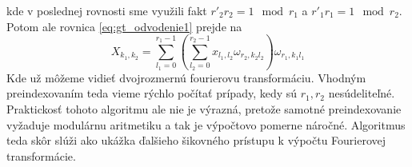 kde v poslednej rovnosti sme využili fakt $r'_2 r_2 = 1 \mod r_1$
a $r'_1 r_1 = 1 \mod r_2$.
Potom ale rovnica \ref{eq:gt_odvodenie1} prejde na
\begin{equation}
    X_{k_1,k_2} 
            = \sum_{l_1=0}^{r_1-1} 
              \left(
                \sum_{l_2=0}^{r_2-1}
                x_{l_1, l_2} \omega_{r_2, k_2 l_2}  
                \right)
              \omega_{r_1, k_1 l_1} 
\end{equation}
Kde už môžeme vidieť dvojrozmernú fourierovu transformáciu. Vhodným
preindexovaním teda vieme rýchlo počítať prípady, kedy sú $r_1,r_2$
nesúdeliteľné. Praktickosť tohoto algoritmu ale nie je výrazná,
pretože samotné preindexovanie vyžaduje modulárnu aritmetiku a tak je
výpočtovo pomerne náročné. Algoritmus teda skôr slúži ako ukážka
ďalšieho šikovného prístupu k výpočtu Fourierovej transformácie.

